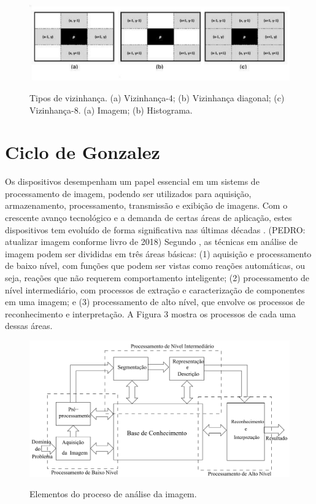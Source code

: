  \begin{figure}[h]
	\centering
	\includegraphics[width=1.0\textwidth]{Imagens/imagem3} %
	\caption[Texto que vai aparecer na lista de fig.]{Tipos de vizinhança. (a) Vizinhança-4; (b) Vizinhança diagonal; (c) Vizinhança-8.  (a) Imagem; (b) Histograma.}
	\label{fig:tux_laplace}
\end{figure}


\section{Ciclo de Gonzalez}
Os dispositivos desempenham um papel essencial em um sistems de processamento de imagem, podendo ser utilizados para aquisição, armazenamento, processamento, transmissão e exibição de imagens. Com o crescente avanço tecnológico e a demanda de certas áreas de aplicação, estes dispositivos tem evoluído de forma significativa nas últimas décadas \cite{PEDRINI2008}.
(PEDRO: atualizar imagem conforme livro de 2018)
Segundo , as técnicas em análise de imagem podem ser divididas em três áreas básicas: (1) aquisição e processamento de baixo nível, com funções que podem ser vistas como reações automáticas, ou seja, reações que não requerem comportamento inteligente; (2) processamento de nível intermediário, com processos de extração e caracterização de componentes em uma imagem; e (3) processamento de alto nível, que envolve os processos de reconhecimento e interpretação. A Figura 3 mostra os processos de cada uma dessas áreas.



 \begin{figure}[h]
	\centering
	\includegraphics[width=1.0\textwidth]{Imagens/imagem5} %
	\caption[Elementos do processo de análise de imagem.]{Elementos do proceso de análise da imagem. }
	\label{fig:tux_laplace}
\end{figure}




